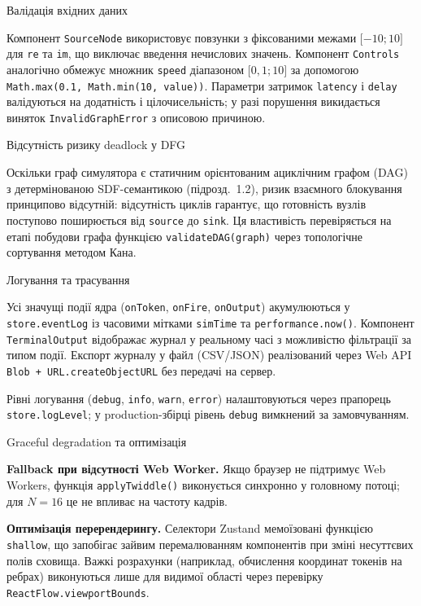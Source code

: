 Валідація вхідних даних

Компонент \texttt{SourceNode} використовує повзунки з фіксованими межами
\(\lbrack - 10;10\rbrack\) для \texttt{re} та \texttt{im}, що виключає
введення нечислових значень. Компонент \texttt{Controls} аналогічно
обмежує множник \texttt{speed} діапазоном \(\lbrack 0,1;10\rbrack\) за
допомогою \texttt{Math.max(0.1,\ Math.min(10,\ value))}. Параметри
затримок \texttt{latency} і \texttt{delay} валідуються на додатність і
цілочисельність; у разі порушення викидається виняток
\texttt{InvalidGraphError} з описовою причиною.

Відсутність ризику deadlock у DFG

Оскільки граф симулятора є статичним орієнтованим ациклічним графом
(DAG) з детермінованою SDF-семантикою (підрозд.~1.2), ризик взаємного
блокування принципово відсутній: відсутність циклів гарантує, що
готовність вузлів поступово поширюється від \texttt{source} до
\texttt{sink}. Ця властивість перевіряється на етапі побудови графа
функцією \texttt{validateDAG(graph)} через топологічне сортування
методом Кана.

Логування та трасування

Усі значущі події ядра (\texttt{onToken}, \texttt{onFire},
\texttt{onOutput}) акумулюються у \texttt{store.eventLog} із часовими
мітками \texttt{simTime} та \texttt{performance.now()}. Компонент
\texttt{TerminalOutput} відображає журнал у реальному часі з можливістю
фільтрації за типом події. Експорт журналу у файл (CSV/JSON)
реалізований через Web API \texttt{Blob\ +\ URL.createObjectURL} без
передачі на сервер.

Рівні логування (\texttt{debug}, \texttt{info}, \texttt{warn},
\texttt{error}) налаштовуються через прапорець \texttt{store.logLevel};
у production-збірці рівень \texttt{debug} вимкнений за замовчуванням.

Graceful degradation та оптимізація

\textbf{Fallback при відсутності Web Worker.} Якщо браузер не підтримує
Web Workers, функція \texttt{applyTwiddle()} виконується синхронно у
головному потоці; для \(N = 16\) це не впливає на частоту кадрів.

\textbf{Оптимізація перерендерингу.} Селектори Zustand мемоїзовані
функцією \texttt{shallow}, що запобігає зайвим перемалюванням
компонентів при зміні несуттєвих полів сховища. Важкі розрахунки
(наприклад, обчислення координат токенів на ребрах) виконуються лише для
видимої області через перевірку \texttt{ReactFlow.viewportBounds}.

